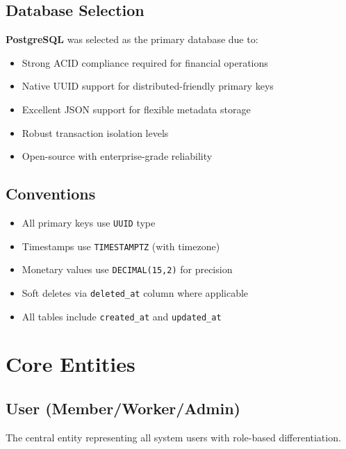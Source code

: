 \documentclass[11pt,a4paper]{article}
\begin{document}
\subsection{Database Selection}
\textbf{PostgreSQL} was selected as the primary database due to:
\begin{itemize}
    \item Strong ACID compliance required for financial operations
    \item Native UUID support for distributed-friendly primary keys
    \item Excellent JSON support for flexible metadata storage
    \item Robust transaction isolation levels
    \item Open-source with enterprise-grade reliability
\end{itemize}

\subsection{Conventions}
\begin{itemize}
    \item All primary keys use \texttt{UUID} type
    \item Timestamps use \texttt{TIMESTAMPTZ} (with timezone)
    \item Monetary values use \texttt{DECIMAL(15,2)} for precision
    \item Soft deletes via \texttt{deleted\_at} column where applicable
    \item All tables include \texttt{created\_at} and \texttt{updated\_at}
\end{itemize}

\section{Core Entities}

\subsection{User (Member/Worker/Admin)}

The central entity representing all system users with role-based differentiation.
\end{document}
